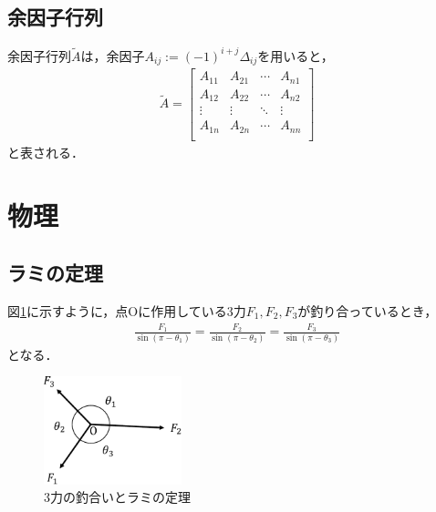 \documentclass[11pt,a4paper]{jsarticle}
\begin{document}
\subsection{余因子行列}

余因子行列$\tilde{A}$は，余因子$A_{ij}:=(-1)^{i+j}\Delta_{ij}$を用いると，
\begin{align*}
  \tilde{A}=
  \begin{bmatrix}
    A_{11} & A_{21} & \cdots & A_{n1} \\
    A_{12} & A_{22} & \cdots & A_{n2} \\
    \vdots & \vdots & \ddots & \vdots \\
    A_{1n} & A_{2n} & \cdots & A_{nn} \\
  \end{bmatrix}
\end{align*}
と表される．

\section{物理}

\subsection{ラミの定理}

図\ref{fig:lami-s-theorem}に示すように，点Oに作用している3力$F_1,F_2,F_3$が釣り合っているとき，
\begin{align*}
  \frac{F_1}{\sin(\pi-\theta_1)}=\frac{F_2}{\sin(\pi-\theta_2)}=\frac{F_3}{\sin(\pi-\theta_3)}
\end{align*}
となる．

\begin{figure}[hbtp]\centering
  \includegraphics[width=4cm]{lami-s-theorem.pdf}
  \caption{3力の釣合いとラミの定理}
  \label{fig:lami-s-theorem}
\end{figure}

\end{document}
